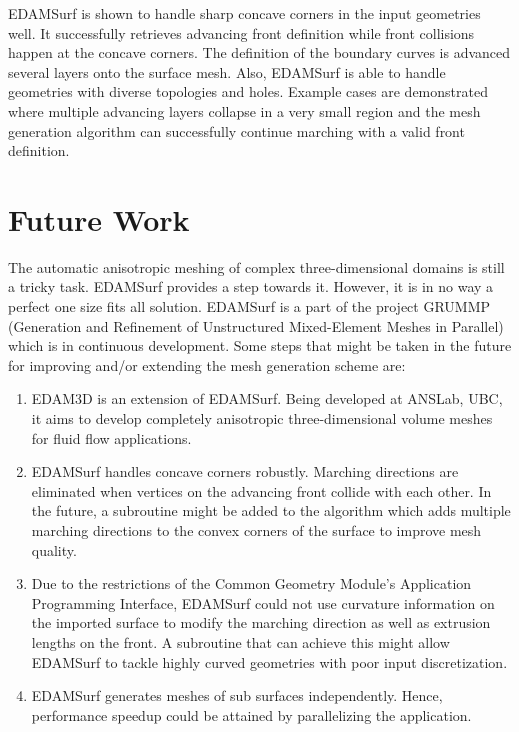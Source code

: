 EDAMSurf is shown to handle sharp concave corners in the input geometries well. It successfully retrieves advancing front definition while front collisions happen at the concave corners. The definition of the boundary curves is advanced several layers onto the surface mesh. Also, EDAMSurf is able to handle geometries with diverse topologies and holes. Example cases are demonstrated where multiple advancing layers collapse in a very small region and the mesh generation algorithm can successfully continue marching with a valid front definition.

\section{Future Work}

The automatic anisotropic meshing of complex three-dimensional domains is still a tricky task. EDAMSurf provides a step towards it. However, it is in no way a perfect one size fits all solution. EDAMSurf is a part of the project GRUMMP (Generation and Refinement of Unstructured Mixed-Element Meshes in Parallel)\cite{ollivier2010grummp} which is in continuous development. Some steps that might be taken in the future for improving and/or extending the mesh generation scheme are:

\begin{enumerate}
	\item EDAM3D is an extension of EDAMSurf. Being developed at ANSLab, UBC, it aims to develop completely anisotropic three-dimensional volume meshes for fluid flow applications.
	\item EDAMSurf handles concave corners robustly. Marching directions are eliminated when vertices on the advancing front collide with each other. In the future, a subroutine might be added to the algorithm which adds multiple marching directions to the convex corners of the surface to improve mesh quality.
	\item Due to the restrictions of the Common Geometry Module's Application Programming Interface, EDAMSurf could not use curvature information on the imported surface to modify the marching direction as well as extrusion lengths on the front. A subroutine that can achieve this might allow EDAMSurf to tackle highly curved geometries with poor input discretization.
	\item EDAMSurf generates meshes of sub surfaces independently. Hence, performance speedup could be attained by parallelizing the application.
\end{enumerate}